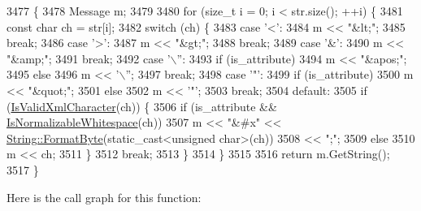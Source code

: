 \begin{DoxyCode}
3477                                              \{
3478   Message m;
3479 
3480   \textcolor{keywordflow}{for} (\textcolor{keywordtype}{size\_t} i = 0; i < str.size(); ++i) \{
3481     \textcolor{keyword}{const} \textcolor{keywordtype}{char} ch = str[i];
3482     \textcolor{keywordflow}{switch} (ch) \{
3483       \textcolor{keywordflow}{case} \textcolor{charliteral}{'<'}:
3484         m << \textcolor{stringliteral}{"&lt;"};
3485         \textcolor{keywordflow}{break};
3486       \textcolor{keywordflow}{case} \textcolor{charliteral}{'>'}:
3487         m << \textcolor{stringliteral}{"&gt;"};
3488         \textcolor{keywordflow}{break};
3489       \textcolor{keywordflow}{case} \textcolor{charliteral}{'&'}:
3490         m << \textcolor{stringliteral}{"&amp;"};
3491         \textcolor{keywordflow}{break};
3492       \textcolor{keywordflow}{case} \textcolor{charliteral}{'\(\backslash\)''}:
3493         \textcolor{keywordflow}{if} (is\_attribute)
3494           m << \textcolor{stringliteral}{"&apos;"};
3495         \textcolor{keywordflow}{else}
3496           m << \textcolor{charliteral}{'\(\backslash\)''};
3497         \textcolor{keywordflow}{break};
3498       \textcolor{keywordflow}{case} \textcolor{charliteral}{'"'}:
3499         \textcolor{keywordflow}{if} (is\_attribute)
3500           m << \textcolor{stringliteral}{"&quot;"};
3501         \textcolor{keywordflow}{else}
3502           m << \textcolor{charliteral}{'"'};
3503         \textcolor{keywordflow}{break};
3504       \textcolor{keywordflow}{default}:
3505         \textcolor{keywordflow}{if} (\hyperlink{classtesting_1_1internal_1_1XmlUnitTestResultPrinter_a2b83a24e3ec8544efa1156f9d6e51873}{IsValidXmlCharacter}(ch)) \{
3506           \textcolor{keywordflow}{if} (is\_attribute && \hyperlink{classtesting_1_1internal_1_1XmlUnitTestResultPrinter_af9d5af6e5d0c505d5c3bd50a8d2a8d76}{IsNormalizableWhitespace}(ch))
3507             m << \textcolor{stringliteral}{"&#x"} << \hyperlink{classtesting_1_1internal_1_1String_af702dc7cbd569589d8e3ff215a7cafa9}{String::FormatByte}(static\_cast<unsigned char>(ch))
3508               << \textcolor{stringliteral}{";"};
3509           \textcolor{keywordflow}{else}
3510             m << ch;
3511         \}
3512         \textcolor{keywordflow}{break};
3513     \}
3514   \}
3515 
3516   \textcolor{keywordflow}{return} m.GetString();
3517 \}
\end{DoxyCode}
Here is the call graph for this function\+:
\nopagebreak
